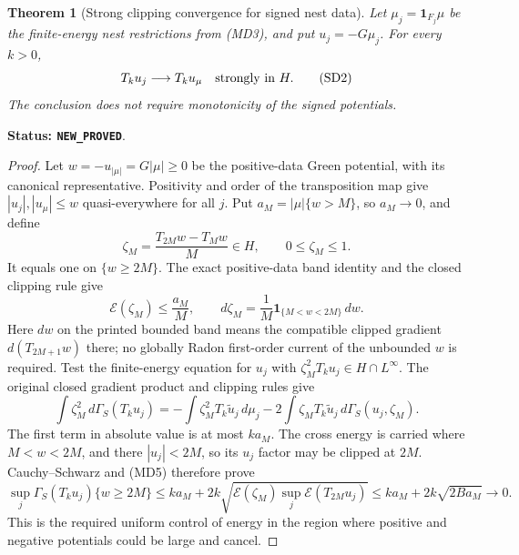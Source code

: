\documentclass[11pt,a4paper]{article}
\numberwithin{equation}{section}
\newtheorem{theorem}{Theorem}[section]
\theoremstyle{definition}
\theoremstyle{remark}
\begin{document}
\begin{theorem}[Strong clipping convergence for signed nest data]
\label{thm:r11-signed-strong-truncations}
Let $\mu_j=\mathbf1_{F_j}\mu$ be the finite-energy nest
restrictions from (MD3), and put $u_j=-G\mu_j$.
For every $k>0$,
\[
                          T_ku_j\longrightarrow T_ku_\mu
                                      \quad\hbox{strongly in }H.
 \tag{SD2}
\]
The conclusion does not require monotonicity of the signed
potentials.
\end{theorem}

\noindent\textbf{Status: \texttt{NEW\_PROVED}}.

\begin{proof}
Let $w=-u_{|\mu|}=G|\mu|\ge0$ be the positive-data Green
potential, with its canonical representative.  Positivity and
order of the transposition map give
$|u_j|,|u_\mu|\le w$ quasi-everywhere for all $j$.
Put $a_M=|\mu|\{w>M\}$, so $a_M\to0$, and define
\[
          \zeta_M=\frac{T_{2M}w-T_Mw}{M}\in H,\qquad
          0\le\zeta_M\le1.
\]
It equals one on $\{w\ge2M\}$.  The exact positive-data
band identity and the closed clipping rule give
\[
 \mathcal E(\zeta_M)\le\frac{a_M}{M},\qquad
 d\zeta_M=\frac1M\mathbf1_{\{M<w<2M\}}\,dw.
 \tag{SD3}
\]
Here $dw$ on the printed bounded band means the compatible
clipped gradient $d(T_{2M+1}w)$ there; no globally Radon
first-order current of the unbounded $w$ is required.
Test the finite-energy equation for $u_j$ with
$\zeta_M^2T_ku_j\in H\cap L^\infty$.
The original closed gradient product and clipping rules give
\[
 \int\zeta_M^2\,d\Gamma_S(T_ku_j)
  =-\int\zeta_M^2 T_k\widetilde u_j\,d\mu_j
                  -2\int\zeta_M T_k\widetilde u_j\,
                                      d\Gamma_S(u_j,\zeta_M).
\]
The first term in absolute value is at most $k a_M$.
The cross energy is carried where $M<w<2M$, and there
$|u_j|<2M$, so its $u_j$ factor may be clipped at $2M$.
Cauchy--Schwarz and (MD5) therefore prove
\[
 \sup_j\Gamma_S(T_ku_j)\{w\ge2M\}
   \le k a_M+2k\sqrt{\mathcal E(\zeta_M)
                                 \sup_j\mathcal E(T_{2M}u_j)}
   \le k a_M+2k\sqrt{2B a_M}\longrightarrow0.
 \tag{SD4}
\]
This is the required uniform control of energy in the region
where positive and negative potentials could be large and cancel.


\end{proof}
\end{document}
